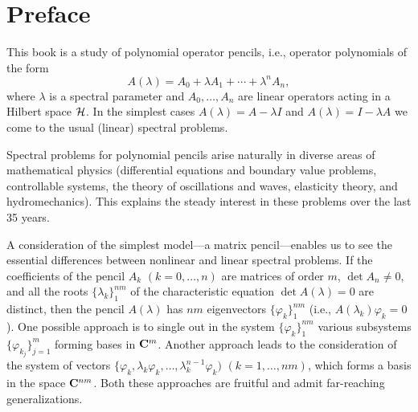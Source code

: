 \chapter*{Preface}

This book is a study of polynomial operator pencils,
i.e., operator polynomials of the form
\begin{equation*}
A(\lambda)=A_0+\lambda A_1+\cdots+\lambda^nA_n,
\end{equation*}
where $\lambda$ is a spectral parameter and $A_0,\dots,A_n$ are linear
operators acting in a Hilbert space $\cal H$. In the simplest cases 
$A(\lambda)=
A-\lambda I$ and $A(\lambda)=I-\lambda A$ we come to the usual (linear)
spectral problems. 

Spectral problems for polynomial pencils arise naturally in diverse
areas of mathematical physics (differential equations and boundary value
problems, controllable systems, the theory of oscillations and waves,
elasticity theory, and hydromechanics). This explains the steady interest
in these problems over the last 35 years.

A consideration of the simplest model---a matrix pencil---enables us
to see the  essential differences between nonlinear and linear
spectral problems. If the coefficients of the pencil $A_k$
$(k=0,\dots,n)$ are matrices of order $m$, $\det A_n\neq 0$, and all
the roots $\{\lambda_k\}_1^{nm}$ of the characteristic equation $\det
A(\lambda) =0$ are distinct, then the pencil $A(\lambda)$ has $nm$
eigenvectors $\{\varphi _k\}_1^{nm}$ (i.e.,
$A(\lambda_k)\varphi_k=0$). One possible approach is to single out in
the system $\{\varphi_k\}_1^{nm}$ various subsystems
$\{\varphi_{k_j}\}_{j=1}^m$ forming bases in $\bold C^m$. Another
approach leads to the consideration of the system of vectors
$\{\varphi_k,\lambda_k \varphi_k,\dots,\lambda_k^{n-1}\varphi_k)$
$(k=1,\dots,nm)$, which forms a basis in the space $\bold C^{nm}$.
Both these approaches are fruitful and admit far-reaching
generalizations.

\endinput
